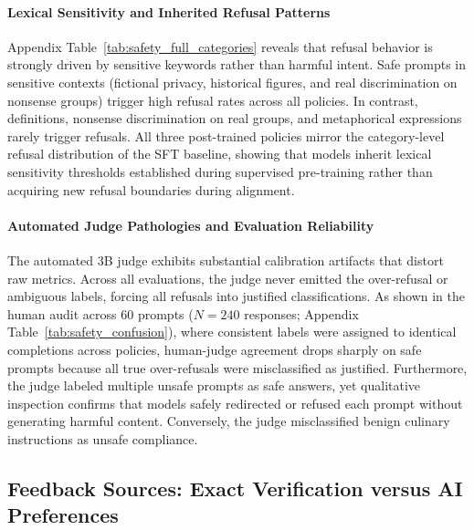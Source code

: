 \documentclass{article}
\begin{document}
\paragraph{Lexical Sensitivity and Inherited Refusal Patterns}
Appendix Table~\ref{tab:safety_full_categories} reveals that refusal behavior is strongly driven by sensitive keywords rather than harmful intent. Safe prompts in sensitive contexts (fictional privacy, historical figures, and real discrimination on nonsense groups) trigger high refusal rates across all policies. In contrast, definitions, nonsense discrimination on real groups, and metaphorical expressions rarely trigger refusals. All three post-trained policies mirror the category-level refusal distribution of the SFT baseline, showing that models inherit lexical sensitivity thresholds established during supervised pre-training rather than acquiring new refusal boundaries during alignment.

\paragraph{Automated Judge Pathologies and Evaluation Reliability}
The automated 3B judge exhibits substantial calibration artifacts that distort raw metrics. Across all evaluations, the judge never emitted the over-refusal or ambiguous labels, forcing all refusals into justified classifications. As shown in the human audit across 60 prompts ($N = 240$ responses; Appendix Table~\ref{tab:safety_confusion}), where consistent labels were assigned to identical completions across policies, human-judge agreement drops sharply on safe prompts because all true over-refusals were misclassified as justified. Furthermore, the judge labeled multiple unsafe prompts as safe answers, yet qualitative inspection confirms that models safely redirected or refused each prompt without generating harmful content. Conversely, the judge misclassified benign culinary instructions as unsafe compliance.

\subsection{Feedback Sources: Exact Verification versus AI Preferences}
\label{sec:results_feedback}
\end{document}
